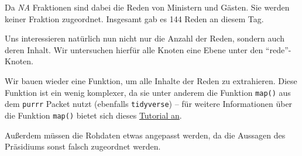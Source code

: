 \documentclass[oneside, 12pt]{scrbook}
\newenvironment{Shaded}{\begin{snugshade}}{\end{snugshade}}
\newcommand{\KeywordTok}[1]{\textcolor[rgb]{0.13,0.29,0.53}{\textbf{#1}}}
\newcommand{\NormalTok}[1]{#1}
\newcommand{\OperatorTok}[1]{\textcolor[rgb]{0.81,0.36,0.00}{\textbf{#1}}}
\newcommand{\StringTok}[1]{\textcolor[rgb]{0.31,0.60,0.02}{#1}}
\theoremstyle{definition}
\theoremstyle{definition}
\theoremstyle{definition}
\theoremstyle{remark}
\begin{document}
Da \emph{NA} Fraktionen sind dabei die Reden von Ministern und Gästen.
Sie werden keiner Fraktion zugeordnet. Insgesamt gab es 144 Reden an
diesem Tag.

Uns interessieren natürlich nun nicht nur die Anzahl der Reden, sondern
auch deren Inhalt. Wir untersuchen hierfür alle Knoten eine Ebene unter
den ``rede''-Knoten.

\begin{Shaded}
\end{Shaded}

Wir bauen wieder eine Funktion, um alle Inhalte der Reden zu
extrahieren. Diese Funktion ist ein wenig komplexer, da sie unter
anderem die Funktion \texttt{map()} aus dem \texttt{purrr} Packet nutzt
(ebenfalls \texttt{tidyverse}) -- für weitere Informationen über die
Funktion \texttt{map()} bietet sich dieses
\href{https://jennybc.github.io/purrr-tutorial/}{Tutorial an}.

Außerdem müssen die Rohdaten etwas angepasst werden, da die Aussagen des
Präsidiums sonst falsch zugeordnet werden.
\end{document}

